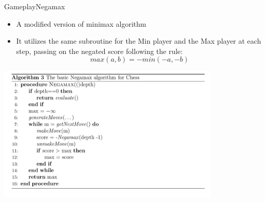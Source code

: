 \documentclass[9pt, unknownkeysallowed]{beamer}
\begin{document}
\begin{frame}{Gameplay}{Negamax}
\begin{itemize}
 \item A modified version of minimax algorithm
 \item It utilizes the same subroutine for the Min player and the Max 
player at each step, passing on the negated score following the rule:
\[max(a,b) = -min(-a,-b)\]
\end{itemize}

\includegraphics[width=0.8\textwidth]{../img/negamax.png}

\end{frame}
\end{document}
